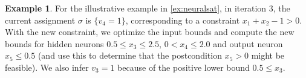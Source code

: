 \documentclass[oneside,11pt,dvipsnames]{book}
\numberwithin{equation}{section}
\theoremstyle{definition}
\newtheorem{example}{Example}[section]
\theoremstyle{remark}
\newcommand{\tvn}[1]{\iftoggle{usecomment}{{\color{red}{[TVN]: #1}}}{}}
\newcommand{\mbd}[1]{\iftoggle{usecomment}{{\color{magenta}{[MBD]: #1}}}{}}
\newcommand{\hd}[1]{\iftoggle{usecomment}{{\color{blue}{[HD]: #1}}}{}}
\newcommand{\tool}{\texttt{NeuralSAT}}
\begin{document}

\begin{example} For the illustrative example in \autoref{ex:neuralsat}, in iteration 3, the current assignment $\sigma$ is  $\{v_4=1\}$, corresponding to a constraint $x_1 + x_2 - 1 > 0$. With the new constraint, we optimize the input bounds and compute the new bounds for hidden neurons $0.5 \le x_3 \le 2.5$, $0 < x_4 \le 2.0$ and output neuron  $x_5 \le 0.5$ (and use this to determine that the postcondition $x_5 > 0$ might be feasible). We also infer $v_3=1$ because of the positive lower bound $0.5 \le x_3$.
\end{example}





\end{document}
